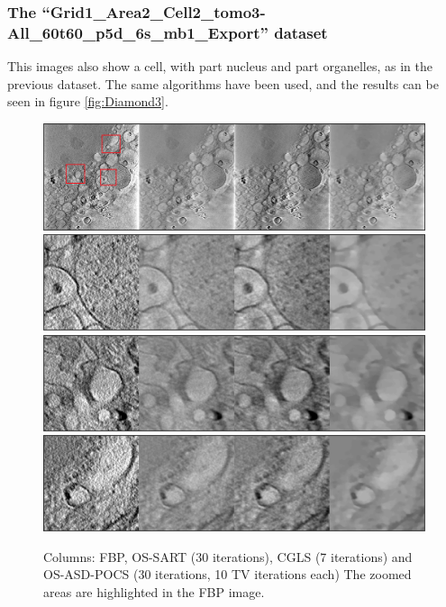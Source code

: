 \subsubsection{The ``Grid1\_Area2\_Cell2\_tomo3-All\_60t60\_p5d\_6s\_mb1\_Export'' dataset}
This images also show a cell, with part nucleus and part organelles, as in the previous dataset. The same algorithms have been used, and the results can be seen in figure \ref{fig:Diamond3}.
\begin{figure}
\begin{center}

\includegraphics[width=\textwidth]{Applications/Diamond1_full_marked.png} 
\includegraphics[width=\textwidth]{Applications/Diamond1zoom1.png} 
\includegraphics[width=\textwidth]{Applications/Diamond1zoom2.png} 
\includegraphics[width=\textwidth]{Applications/Diamond1zoom3.png} 

\end{center}

\caption[Cell image recosntructed with different algorithms 2]{\label{fig:Diamond2} Columns: FBP, OS-SART (30 iterations), CGLS (7 iterations) and OS-ASD-POCS (30 iterations, 10 TV iterations each) The zoomed areas are highlighted in the FBP image.} 
\end{figure}

